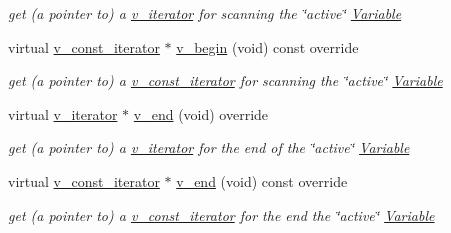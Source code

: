 \begin{Indent}
\begin{DoxyCompactItemize}
\begin{DoxyCompactList}\small\item\em get (a pointer to) a \mbox{\hyperlink{class_s_m_spp__di__unipi__it_1_1_one_var_constraint_1_1v__iterator}{v\+\_\+iterator}} for scanning the \char`\"{}active\char`\"{} \mbox{\hyperlink{class_s_m_spp__di__unipi__it_1_1_variable}{Variable}} \end{DoxyCompactList}\item 
virtual \mbox{\hyperlink{class_s_m_spp__di__unipi__it_1_1_one_var_constraint_1_1v__const__iterator}{v\+\_\+const\+\_\+iterator}} $\ast$ \mbox{\hyperlink{class_s_m_spp__di__unipi__it_1_1_one_var_constraint_a997de10fbae309ac6e357d7ad96a8052}{v\+\_\+begin}} (void) const override
\begin{DoxyCompactList}\small\item\em get (a pointer to) a \mbox{\hyperlink{class_s_m_spp__di__unipi__it_1_1_one_var_constraint_1_1v__const__iterator}{v\+\_\+const\+\_\+iterator}} for scanning the \char`\"{}active\char`\"{} \mbox{\hyperlink{class_s_m_spp__di__unipi__it_1_1_variable}{Variable}} \end{DoxyCompactList}\item 
virtual \mbox{\hyperlink{class_s_m_spp__di__unipi__it_1_1_one_var_constraint_1_1v__iterator}{v\+\_\+iterator}} $\ast$ \mbox{\hyperlink{class_s_m_spp__di__unipi__it_1_1_one_var_constraint_ad17303c6335cb94a9d32f1fce77501fd}{v\+\_\+end}} (void) override
\begin{DoxyCompactList}\small\item\em get (a pointer to) a \mbox{\hyperlink{class_s_m_spp__di__unipi__it_1_1_one_var_constraint_1_1v__iterator}{v\+\_\+iterator}} for the end of the \char`\"{}active\char`\"{} \mbox{\hyperlink{class_s_m_spp__di__unipi__it_1_1_variable}{Variable}} \end{DoxyCompactList}\item 
virtual \mbox{\hyperlink{class_s_m_spp__di__unipi__it_1_1_one_var_constraint_1_1v__const__iterator}{v\+\_\+const\+\_\+iterator}} $\ast$ \mbox{\hyperlink{class_s_m_spp__di__unipi__it_1_1_one_var_constraint_a17969277c912e791df025c9bebda3217}{v\+\_\+end}} (void) const override
\begin{DoxyCompactList}\small\item\em get (a pointer to) a \mbox{\hyperlink{class_s_m_spp__di__unipi__it_1_1_one_var_constraint_1_1v__const__iterator}{v\+\_\+const\+\_\+iterator}} for the end the \char`\"{}active\char`\"{} \mbox{\hyperlink{class_s_m_spp__di__unipi__it_1_1_variable}{Variable}} \end{DoxyCompactList}\item 

\end{DoxyCompactItemize}
\end{Indent}
